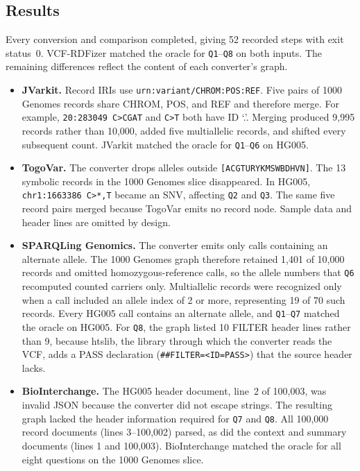 \documentclass[11pt]{article}
\begin{document}
\subsection{Results}\label{subsec:converters-results}
Every conversion and comparison completed, giving 52 recorded steps with exit status~0.
VCF-RDFizer matched the oracle for \texttt{Q1}--\texttt{Q8} on both inputs.
The remaining differences reflect the content of each converter's graph.
\begin{itemize}
\item \textbf{JVarkit.}
Record IRIs use \texttt{urn:variant/CHROM:POS:REF}.
Five pairs of 1000 Genomes records share CHROM, POS, and REF and therefore merge.
For example, \texttt{20:283049 C>CGAT} and \texttt{C>T} both have ID `.'.
Merging produced 9,995 records rather than 10,000, added five multiallelic records, and shifted every subsequent count.
JVarkit matched the oracle for \texttt{Q1}--\texttt{Q6} on HG005.
\item \textbf{TogoVar.}
The converter drops alleles outside \texttt{[ACGTURYKMSWBDHVN]}.
The 13 symbolic records in the 1000 Genomes slice disappeared.
In HG005, \texttt{chr1:1663386 C>*,T} became an SNV, affecting \texttt{Q2} and \texttt{Q3}.
The same five record pairs merged because TogoVar emits no record node.
Sample data and header lines are omitted by design.
\item \textbf{SPARQLing Genomics.}
The converter emits only calls containing an alternate allele.
The 1000 Genomes graph therefore retained 1,401 of 10,000 records and omitted homozygous-reference calls, so the allele numbers that \texttt{Q6} recomputed counted carriers only.
Multiallelic records were recognized only when a call included an allele index of 2 or more, representing 19 of 70 such records.
Every HG005 call contains an alternate allele, and \texttt{Q1}--\texttt{Q7} matched the oracle on HG005.
For \texttt{Q8}, the graph listed 10 FILTER header lines rather than 9, because htslib, the library through which the converter reads the VCF, adds a PASS declaration (\texttt{\#\#FILTER=<ID=PASS>}) that the source header lacks.
\item \textbf{BioInterchange.}
The HG005 header document, line~2 of 100,003, was invalid JSON because the converter did not escape strings.
The resulting graph lacked the header information required for \texttt{Q7} and \texttt{Q8}.
All 100,000 record documents (lines 3--100,002) parsed, as did the context and summary documents (lines 1 and 100,003).
BioInterchange matched the oracle for all eight questions on the 1000 Genomes slice.
\end{itemize}
\end{document}
